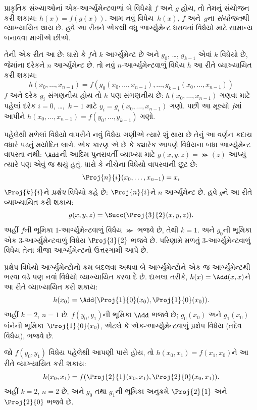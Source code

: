 \documentclass[../../../include/open-logic-section]{subfiles}
\begin{document}

પ્રાકૃતિક સંખ્યાઓનાં એક-આર્ગ્યુમેન્ટવાળાં બે વિધેયો $f$ અને $g$ હોય,
તો તેમનું સંયોજન કરી શકાય: $h(x) = f(g(x))$. આમ નવું વિધેય~$h(x)$,
$f$ અને~$g$ના \emph{સંયોજન}થી વ્યાખ્યાયિત થાય છે. હવે આ રીતને
એકથી વધુ આર્ગ્યુમેન્ટ ધરાવતાં વિધેયો માટે સામાન્ય બનાવવા માગીએ છીએ.

તેની એક રીત આ છે: ધારો કે $f$ને $k$ આર્ગ્યુમેન્ટ છે અને
$g_0$, \dots, $g_{k-1}$ એવાં $k$ વિધેયો છે, જેમાંના દરેકને
$n$ આર્ગ્યુમેન્ટ છે. તો નવું $n$-આર્ગ્યુમેન્ટવાળું વિધેય $h$ આ રીતે
વ્યાખ્યાયિત કરી શકાય:
\[
h(x_0, \dots, x_{n-1}) =
f(g_0(x_0, \dots, x_{n-1}), \dots, g_{k-1}(x_0, \dots, x_{n-1}))
\]
$f$ અને દરેક $g_i$ સંગણનીય હોય તો $h$ પણ સંગણનીય છે:
$h(x_0, \dots, x_{n-1})$ ગણવા માટે પહેલાં દરેક $i = 0$,
\dots,~$k-1$ માટે $y_i = g_i(x_0, \dots, x_{n-1})$ ગણો.
પછી આ મૂલ્યો $f$માં આપીને
$h(x_0, \dots, x_{n-1}) = f(y_0, \dots, y_{k-1})$ ગણો.


પહેલેથી મળેલાં વિધેયો વાપરીને નવું વિધેય ગણીએ ત્યારે શું થાય છે તેનું
આ વર્ણન કદાચ વધારે પડતું મર્યાદિત લાગે. એક કારણ એ છે કે ક્યારેક
આપણે વિધેયના બધા આર્ગ્યુમેન્ટ વાપરતા નથી: $\Add$ની આદિમ
પુનરાવર્તી વ્યાખ્યા માટે $g(x, y, z) = \Succ(z)$ આપ્યું ત્યારે પણ
એવું જ થયું હતું. ધારો કે નીચેના વિધેયો વાપરવાની છૂટ છે:
\[
\Proj{n}{i}(x_0, \dots, x_{n-1}) = x_i
\]
$\Proj{k}{i}$ને \emph{પ્રક્ષેપ} વિધેયો કહે છે:
$\Proj{n}{i}$ને $n$ આર્ગ્યુમેન્ટ છે. હવે $g$ને આ રીતે
વ્યાખ્યાયિત કરી શકાય:
\[
g(x, y, z) = \Succ(\Proj{3}{2}(x, y, z)).
\]
અહીં $f$ની ભૂમિકા $1$-આર્ગ્યુમેન્ટવાળું વિધેય $\Succ$ ભજવે છે,
તેથી $k=1$. અને $g_0$ની ભૂમિકા એક $3$-આર્ગ્યુમેન્ટવાળું વિધેય
$\Proj{3}{2}$ ભજવે છે. પરિણામે મળતું $3$-આર્ગ્યુમેન્ટવાળું વિધેય
તેના ત્રીજા આર્ગ્યુમેન્ટનો ઉત્તરગામી આપે છે.

પ્રક્ષેપ વિધેયો આર્ગ્યુમેન્ટોનો ક્રમ બદલવા અથવા બે આર્ગ્યુમેન્ટોને
એક જ આર્ગ્યુમેન્ટથી ભરવા વડે પણ નવાં વિધેયો વ્યાખ્યાયિત કરવા દે છે.
દાખલા તરીકે, $h(x) = \Add(x, x)$ને આ રીતે વ્યાખ્યાયિત કરી શકાય:
\[
h(x_0) = \Add(\Proj{1}{0}(x_0),\Proj{1}{0}(x_0)).
\]
અહીં $k=2$, $n=1$ છે. $f(y_0,y_1)$ની ભૂમિકા $\Add$ ભજવે છે;
$g_0(x_0)$ અને $g_1(x_0)$ બંનેની ભૂમિકા~$\Proj{1}{0}(x_0)$,
એટલે કે એક-આર્ગ્યુમેન્ટવાળું પ્રક્ષેપ વિધેય (તદેવ વિધેય), ભજવે છે.

જો $f(y_0, y_1)$ વિધેય પહેલેથી આપણી પાસે હોય, તો
$h(x_0, x_1) = f(x_1, x_0)$ને આ રીતે વ્યાખ્યાયિત કરી શકાય:
\[
h(x_0, x_1) = f(\Proj{2}{1}(x_0, x_1),\Proj{2}{0}(x_0, x_1)).
\]
અહીં $k=2$, $n = 2$ છે, અને $g_0$ તથા $g_1$ની ભૂમિકા અનુક્રમે
$\Proj{2}{1}$ અને~$\Proj{2}{0}$ ભજવે છે.
\end{document}
